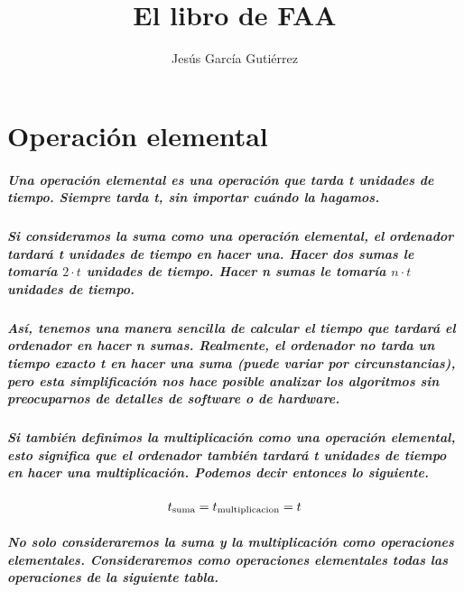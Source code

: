 \documentclass{book}
\title{El libro de FAA}
\date{}
\author{Jesús García Gutiérrez}
\begin{document}
	\maketitle{}
	\chapter{Operación elemental}
	\paragraph{Una operación elemental es una operación que tarda \textit{t} unidades de tiempo. Siempre tarda \textit{t}, sin importar cuándo la hagamos.}
	\paragraph{Si consideramos la suma como una operación elemental, el ordenador tardará \textit{t} unidades de tiempo en hacer una. Hacer dos sumas le tomaría $2 \cdot t$ unidades de tiempo. Hacer n sumas le tomaría $n \cdot t$ unidades de tiempo.}	
	\paragraph{Así,  tenemos una manera sencilla de calcular el tiempo que tardará el ordenador en hacer \textit{n} sumas. Realmente, el ordenador no tarda un tiempo exacto \textit{t} en hacer una suma (puede variar por circunstancias), pero esta simplificación nos hace posible analizar los algoritmos sin preocuparnos de detalles de software o de hardware.}
	\paragraph{Si también definimos la multiplicación como una operación elemental, esto significa que el ordenador también tardará \textit{t} unidades de tiempo en hacer una multiplicación. Podemos decir entonces lo siguiente.}
      \begin{equation}
	      t\textsubscript{suma} = t\textsubscript{multiplicacion} = t
      \end{equation}	
      \paragraph{No solo consideraremos la suma y la multiplicación como operaciones elementales. Consideraremos como operaciones elementales todas las operaciones de la siguiente tabla.}
\end{document}
